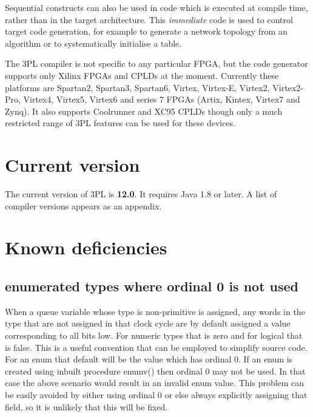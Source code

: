         Sequential constructs can also be used in code which is executed at
        compile time, rather than in the target architecture. This {\em
        immediate} code is used to control target code generation, for example
        to generate a network topology from an algorithm or to systematically
        initialise a table.

        The 3PL compiler is not specific to any particular FPGA, but the code
        generator supports only Xilinx FPGAs and CPLDs at the moment.
        Currently these platforms are Spartan2, Spartan3, Spartan6, Virtex,
        Virtex-E, Virtex2, Virtex2-Pro, Virtex4, Virtex5, Virtex6 and series 7
        FPGAs (Artix, Kintex, Virtex7 and Zynq). It also supports Coolrunner
        and XC95 CPLDs though only a much restricted range of 3PL features can
        be used for these devices.

    \section{Current version}

        The current version of 3PL is {\bf 12.0}. It requires Java 1.8 or
        later. A list of compiler versions appears as an appendix.

    \section{Known deficiencies}

        \subsection{enumerated types where ordinal 0 is not used}

            When a queue variable whose type is non-primitive is assigned, any
            words in the type that are not assigned in that clock cycle are by
            default assigned a value corresponding to all bits low. For numeric
            types that is zero and for logical that is false. This is a useful
            convention that can be employed to simplify source code. For an enum
            that default will be the value which has ordinal 0. If an enum is
            created using inbuilt procedure enumv() then ordinal 0 may not be
            used. In that case the above scenario would result in an invalid
            enum value. This problem can be easily avoided by either using
            ordinal 0 or else always explicitly assigning that field, so it
            is unlikely that this will be fixed.

